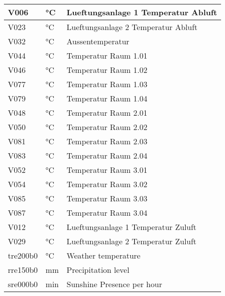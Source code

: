 \begin{table}[htbp]
\begin{tabular}{|l|l|l|}
    \hline
    \rowcolor[rgb]{ .863,  .902,  .945} V006 & °C   & Lueftungsanlage 1 Temperatur Abluft  \bigstrut\\
    \hline
    \rowcolor[rgb]{ .863,  .902,  .945} V023 & °C   & Lueftungsanlage 2 Temperatur Abluft  \bigstrut\\
    \hline
    \rowcolor[rgb]{ .863,  .902,  .945} V032 & °C   & Aussentemperatur \bigstrut\\
    \hline
    \rowcolor[rgb]{ .992,  .914,  .851} V044 & °C   & Temperatur Raum 1.01 \bigstrut\\
    \hline
    \rowcolor[rgb]{ .992,  .914,  .851} V046 & °C   & Temperatur Raum 1.02 \bigstrut\\
    \hline
    \rowcolor[rgb]{ .992,  .914,  .851} V077 & °C   & Temperatur Raum 1.03 \bigstrut\\
    \hline
    \rowcolor[rgb]{ .992,  .914,  .851} V079 & °C   & Temperatur Raum 1.04 \bigstrut\\
    \hline
    \rowcolor[rgb]{ .992,  .914,  .851} V048 & °C   & Temperatur Raum 2.01 \bigstrut\\
    \hline
    \rowcolor[rgb]{ .992,  .914,  .851} V050 & °C   & Temperatur Raum 2.02 \bigstrut\\
    \hline
    \rowcolor[rgb]{ .992,  .914,  .851} V081 & °C   & Temperatur Raum 2.03 \bigstrut\\
    \hline
    \rowcolor[rgb]{ .992,  .914,  .851} V083 & °C   & Temperatur Raum 2.04 \bigstrut\\
    \hline
    \rowcolor[rgb]{ .992,  .914,  .851} V052 & °C   & Temperatur Raum 3.01 \bigstrut\\
    \hline
    \rowcolor[rgb]{ .992,  .914,  .851} V054 & °C   & Temperatur Raum 3.02 \bigstrut\\
    \hline
    \rowcolor[rgb]{ .992,  .914,  .851} V085 & °C   & Temperatur Raum 3.03 \bigstrut\\
    \hline
    \rowcolor[rgb]{ .992,  .914,  .851} V087 & °C   & Temperatur Raum 3.04 \bigstrut\\
    \hline
    \rowcolor[rgb]{ .992,  .914,  .851} V012 & °C   & Lueftungsanlage 1 Temperatur Zuluft \bigstrut\\
    \hline
    \rowcolor[rgb]{ .992,  .914,  .851} V029 & °C   & Lueftungsanlage 2 Temperatur Zuluft \bigstrut\\
    \hline
    \rowcolor[rgb]{ .863,  .902,  .945} tre200b0 & °C   & Weather temperature \bigstrut\\
    \hline
    \rowcolor[rgb]{ .863,  .902,  .945} rre150b0 & mm   & Precipitation level \bigstrut\\
    \hline
    \rowcolor[rgb]{ .863,  .902,  .945} sre000b0 & min  & Sunshine Presence per hour \bigstrut\\
    \hline
    \end{tabular}%
\end{table}%

